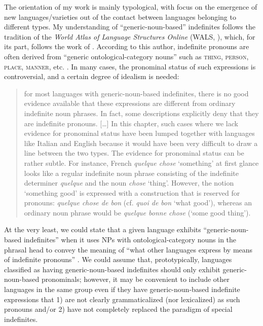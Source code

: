 \documentclass[output=paper,colorlinks,citecolor=brown]{langscibook}
\begin{document}
The orientation of my work is mainly typological, with focus on the emergence of new languages/varieties out of the contact between languages belonging to different types. My understanding of “generic-noun-based” indefinites follows the tradition of the \textit{World Atlas of Language Structures Online} (WALS, \citealt{Haspelmath2013}), which, for its part, follows the work of \citet{Haspelmath1997}. According to this author, indefinite pronouns are often derived from “generic ontological\hyp category nouns” such as \textsc{thing}, \textsc{person}, \textsc{place}, \textsc{manner}, etc.  \citep[26, 52]{Haspelmath1997}. In many cases, the pronominal status of such expressions is controversial, and a certain degree of idealism is needed:

\begin{quote}
for most languages with generic-noun-based indefinites, there is no good evidence available that these expressions are different from ordinary indefinite noun phrases. In fact, some descriptions explicitly deny that they are indefinite pronouns. […] In this chapter, such cases where we lack evidence for pronominal status have been lumped together with languages like Italian and English because it would have been very difficult to draw a line between the two types. The evidence for pronominal status can be rather subtle. For instance, French \textit{quelque chose}  ‘something’ at first glance looks like a regular indefinite noun phrase consisting of the indefinite determiner \textit{quelque} and the noun \textit{chose} ‘thing’. However, the notion ‘something good’ is expressed with a construction that is reserved for pronouns: \textit{quelque chose de bon} (cf. \textit{quoi de bon}  ‘what good’), whereas an ordinary noun phrase would be \textit{quelque bonne chose}  (‘some good thing’). \citep[§2.2]{Haspelmath2013}
\end{quote}

\begin{sloppypar}
At the very least, we could state that a given language exhibits “generic\hyp noun\hyp based indefinites” when it uses NPs with ontological\hyp category nouns in the phrasal head to convey the meaning of “what other languages express by means of indefinite pronouns” \citep[28]{Haspelmath1997}. We could assume that, prototypically, languages classified as having generic-noun-based indefinites should only exhibit generic-noun-based pronominals; however, it may be convenient to include other languages in the same group even if they have generic-noun-based indefinite expressions that 1) are not clearly grammaticalized (nor lexicalized) as such pronouns and/or 2) have not completely replaced the paradigm of special indefinites. 
\end{sloppypar}
\end{document}

